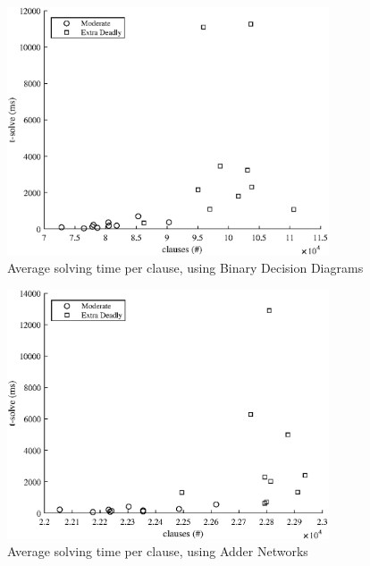 {\begin{figure}
    \centering
    \includegraphics[width = 0.85\textwidth]{Figures/killer_BDD_solve.eps}
    \caption{Average solving time per clause, using Binary Decision Diagrams}
    \label{killerBDDsolve}
\end{figure}

\begin{figure}
    \centering
    \includegraphics[width = 0.85\textwidth]{Figures/killer_AN_solve.eps}
    \caption{Average solving time per clause, using Adder Networks}
    \label{killerANsolve}
\end{figure}

}
